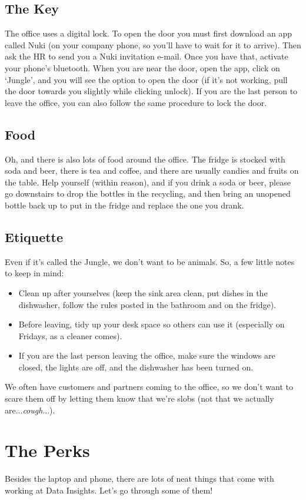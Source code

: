 \documentclass[11pt]{report}
\begin{document}
\subsection{The Key}
\label{TheKey}
The office uses a digital lock. To open the door you must first download an app called Nuki (on your company phone, so you'll have to wait for it to arrive). Then ask the HR to send you a Nuki invitation e-mail. Once you have that, activate your phone's bluetooth. When you are near the door, open the app, click on `Jungle', and you will see the option to open the door (if it's not working, pull the door towards you slightly while clicking unlock). If you are the last person to leave the office, you can also follow the same procedure to lock the door.

\subsection{Food}
Oh, and there is also lots of food around the office. The fridge is stocked with soda and beer, there is tea and coffee, and there are usually candies and fruits on the table. Help yourself (within reason), and if you drink a soda or beer, please go downstairs to drop the bottles in the recycling, and then bring an unopened bottle back up to put in the fridge and replace the one you drank.

\subsection{Etiquette}
Even if it's called the Jungle, we don't want to be animals. So, a few little notes to keep in mind:
\begin{itemize}
\item Clean up after yourselves (keep the sink area clean, put dishes in the dishwasher, follow the rules posted in the bathroom and on the fridge).
\item Before leaving, tidy up your desk space so others can use it (especially on Fridays, as a cleaner comes).
\item If you are the last person leaving the office, make sure the windows are closed, the lights are off, and the dishwasher has been turned on.
\end{itemize}
We often have customers and partners coming to the office, so we don't want to scare them off by letting them know that we're slobs (not that we actually are...\emph{cough}...).

\section{The Perks}
Besides the laptop and phone, there are lots of neat things that come with working at Data Insights. Let's go through some of them!
\end{document}
